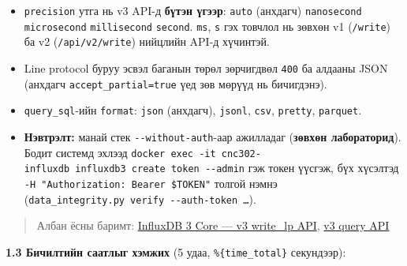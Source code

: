 \begin{itemize}
\tightlist
\item
  \texttt{precision} утга нь v3 API-д \textbf{бүтэн үгээр}: \texttt{auto} (анхдагч) \textbar{} \texttt{nanosecond} \textbar{} \texttt{microsecond} \textbar{} \texttt{millisecond} \textbar{} \texttt{second}. \texttt{ms}, \texttt{s} гэх товчлол нь зөвхөн v1 (\texttt{/write}) ба v2 (\texttt{/api/v2/write}) нийцлийн API-д хүчинтэй.
\item
  Line protocol буруу эсвэл баганын төрөл зөрчигдвөл \texttt{400} ба алдааны JSON (анхдагч \texttt{accept\_\allowbreak{}partial=\allowbreak{}true} үед зөв мөрүүд нь бичигдэнэ).
\item
  \texttt{query\_sql}-ийн \texttt{format}: \texttt{json} (анхдагч), \texttt{jsonl}, \texttt{csv}, \texttt{pretty}, \texttt{parquet}.
\item
  \textbf{Нэвтрэлт:} манай стек \texttt{-\/-without-auth}-аар ажилладаг (\textbf{зөвхөн лабораторид}). Бодит системд эхлээд \texttt{docker\ exec\ -it\ cnc302-influxdb\ influxdb3\ create\ token\ -\/\allowbreak{}-admin} гэж токен үүсгэж, бүх хүсэлтэд \texttt{-H\ "Authorization:\allowbreak{}\ Bearer\ \$TOKEN"} толгой нэмнэ (\texttt{data\_\allowbreak{}integrity.\allowbreak{}py\ verify\ -\/\allowbreak{}-auth-token\ \ldots{}}).
\end{itemize}

\begin{quote}
Албан ёсны баримт: \href{https://docs.influxdata.com/influxdb3/core/write-data/http-api/v3-write-lp/}{InfluxDB 3 Core --- v3 write\_\allowbreak{}lp API}, \href{https://docs.influxdata.com/influxdb3/core/query-data/execute-queries/influxdb-v3-api/}{v3 query API}
\end{quote}

\textbf{1.3 Бичилтийн саатлыг хэмжих} (5 удаа, \texttt{\%\{time\_total\}} секундээр):

\begin{Shaded}
\begin{Highlighting}[]
 \KeywordTok{;}  \KeywordTok{\textbackslash{}}
   \KeywordTok{\textbackslash{}}
    \KeywordTok{\textbackslash{}}
   \VariableTok{$(}\VariableTok{)}\KeywordTok{;} 
\end{Highlighting}
\end{Shaded}

